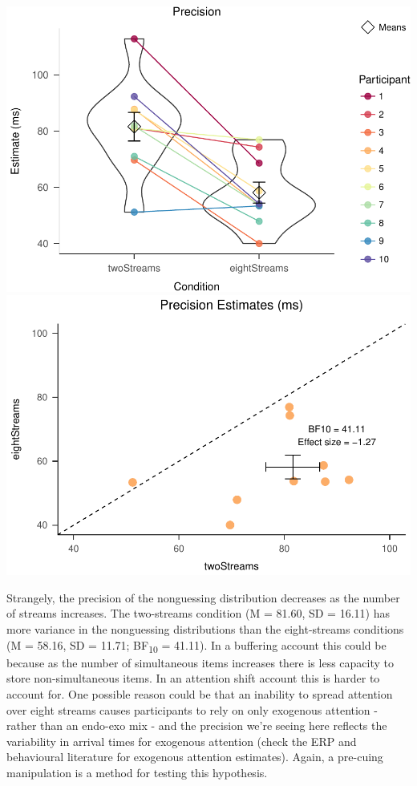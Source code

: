 \documentclass[,man]{apa6}
\theoremstyle{definition}
\theoremstyle{definition}
\theoremstyle{definition}
\theoremstyle{remark}
\begin{document}
\includegraphics{nStreams_Bayesian_files/figure-latex/unnamed-chunk-4-1.pdf}
\includegraphics{nStreams_Bayesian_files/figure-latex/unnamed-chunk-4-2.pdf}

Strangely, the precision of the nonguessing distribution decreases as
the number of streams increases. The two-streams condition (M = 81.60,
SD = 16.11) has more variance in the nonguessing distributions than the
eight-streams conditions (M = 58.16, SD = 11.71; BF\textsubscript{10} =
41.11). In a buffering account this could be because as the number of
simultaneous items increases there is less capacity to store
non-simultaneous items. In an attention shift account this is harder to
account for. One possible reason could be that an inability to spread
attention over eight streams causes participants to rely on only
exogenous attention - rather than an endo-exo mix - and the precision
we're seeing here reflects the variability in arrival times for
exogenous attention (check the ERP and behavioural literature for
exogenous attention estimates). Again, a pre-cuing manipulation is a
method for testing this hypothesis.
\end{document}
